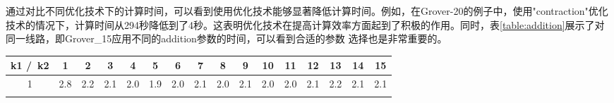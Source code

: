 通过对比不同优化技术下的计算时间，可以看到使用优化技术能够显著降低计算时间。例如，在Grover-20的例子中，使用"contraction"优化技术的情况下，计算时间从294秒降低到了4秒。这表明优化技术在提高计算效率方面起到了积极的作用。同时，表\ref{table:addition}展示了对同一线路，即Grover\_15应用不同的addition参数的时间，可以看到合适的参数
选择也是非常重要的。
\begin{table}[!htbp]
    \centering
    \begin{tabular}{c|ccccccccccccccc}
        \rowcolor[HTML]{FFFFFF} 
        k1 /\ k2                         & 1                           & 2                           & 3                           & 4                           & 5                           & 6                           & 7                          & 8                           & 9                           & 10                          & 11                          & 12                          & 13                          & 14                          & 15                          \\\hline
            \rowcolor[HTML]{FFFFFF} 
    1                          & 2.8                                              & 2.2                         & 2.1                         & \cellcolor[HTML]{CCC0DA}2.0 & \cellcolor[HTML]{CCC0DA}1.9 & \cellcolor[HTML]{CCC0DA}2.0                      & 2.1                        & \cellcolor[HTML]{CCC0DA}2.0 & 2.1                         & \cellcolor[HTML]{CCC0DA}2.0 & \cellcolor[HTML]{CCC0DA}2.0 & 2.1                         & 2.2                         & 2.1                         & 2.1                         \\ \cline{3-7}
    \rowcolor[HTML]{CCC0DA} 
    

\end{tabular}
\end{table}
